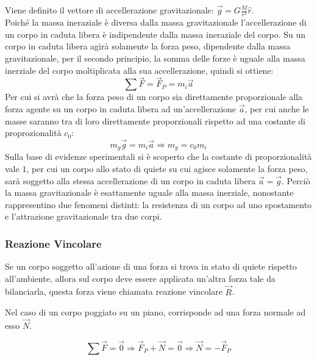 \documentclass{article}
\numberwithin{equation}{subsection}
\begin{document}
Viene definito il vettore di accellerazione gravitazionale: 
$\vec{g}=G\displaystyle\frac{M}{r^{2}}\hat{r}$.\\
Poiché la massa ineraziale è diversa dalla massa gravitazionale 
l'accellerazione di un corpo in caduta libera è indipendente 
dalla massa ineraziale del corpo. Su un corpo in caduta libera agirà solamente la forza peso, dipendente dalla massa gravitazionale, per il secondo 
principio, la somma delle forze è uguale alla massa inerziale del corpo moltiplicata alla sua accellerazione, quindi si ottiene: 
\begin{equation*}
    \sum\vec{F}=\vec{F}_P=m_i\vec{a}
\end{equation*}
Per cui si avrà che la forza peso di un corpo sia direttamente proporzionale alla forza agente su un corpo in caduta libera ad un'accellerazione $\vec{a}$, 
per cui anche le masse saranno tra di loro direttamente proporzionali rispetto ad una costante di proprozionalità $c_0$:
\begin{equation*}
    m_g\vec{g}=m_i\vec{a}\Rightarrow m_g=c_0m_i
\end{equation*}
Sulla base di evidenze sperimentali si è scoperto che la costante di proporzionalità vale $1$, per cui un corpo allo stato di quiete su cui agisce 
solamente la forza peso, sarà soggetto alla stessa accellerazione di un corpo in caduta libera $\vec{a}=\vec{g}$. Perciò la massa gravitazionale è 
esattamente uguale alla massa inerziale, nonostante rappresentino due fenomeni distinti: la resistenza di un corpo ad uno spostamento e 
l'attrazione gravitazionale tra due corpi.\\

\subsubsection{Reazione Vincolare}

Se un corpo soggetto all'azione di una forza si trova in stato di quiete rispetto all'ambiente, allora sul corpo deve essere applicata un'altra forza tale da bilanciarla, 
questa forza viene chiamata reazione vincolare $\vec{R}$. 

Nel caso di un corpo poggiato su un piano, corrisponde ad una forza normale ad esso $\vec{N}$. 

\begin{equation}
    \displaystyle\sum\vec{F}=\vec{0}\Rightarrow\vec{F}_P+\vec{N}=\vec{0}\Rightarrow\vec{N}=-\vec{F}_P
\end{equation}
\end{document}
